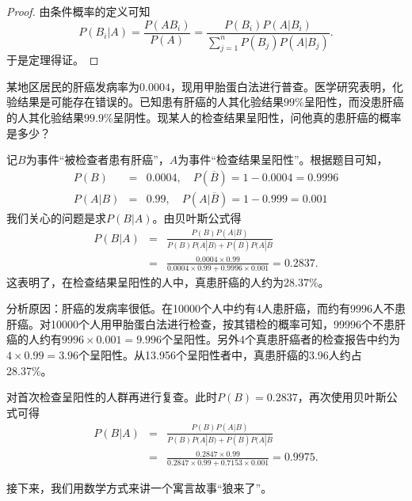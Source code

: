 \begin{proof}
由条件概率的定义可知$$P(B_{i} |A)=\frac{P(AB_{i} )}{P(A)} =\frac{P(B_{i} )P(A|B_{i} )}{\sum_{j=1}^{n} P(B_{j} )P(A|B_{j} )}.$$
于是定理得证。
\end{proof}

\begin{example}\label{ex:chap01_bayes_formula_liver_cancer}
某地区居民的肝癌发病率为$0.0004$，现用甲胎蛋白法进行普查。医学研究表明，化验结果是可能存在错误的。已知患有肝癌的人其化验结果$99\%$呈阳性，而没患肝癌的人其化验结果$99.9\%$呈阴性。现某人的检查结果呈阳性，问他真的患肝癌的概率是多少？
\end{example}
\begin{solution}
记$B$为事件“被检查者患有肝癌”，$A$为事件“检查结果呈阳性”。根据题目可知，
\begin{eqnarray*}
    P(B) &=& 0.0004, \quad P(\overline{B}) = 1- 0.0004 = 0.9996\\
    P(A|B) &=& 0.99, \quad P(A|\overline{B}) = 1- 0.999 = 0.001
\end{eqnarray*}
我们关心的问题是求$P(B|A)$。由贝叶斯公式得
\begin{eqnarray*}
    P(B|A) &=& \frac{P(B)P(A|B)}{P(B)P(A|B)+P(\overline{B})P(A|\overline{B}}\\
    &=& \frac{0.0004 \times 0.99}{0.0004\times 0.99 + 0.9996 \times 0.001} = 0.2837.
\end{eqnarray*}
这表明了，在检查结果呈阳性的人中，真患肝癌的人约为$28.37\%$。
\end{solution}
\begin{remark}
    分析原因：肝癌的发病率很低。在10000个人中约有4人患肝癌，而约有9996人不患肝癌。对10000个人用甲胎蛋白法进行检查，按其错检的概率可知，99996个不患肝癌的人约有$9996\times 0.001 = 9.996$个呈阳性。另外4个真患肝癌者的检查报告中约为$4\times 0.99 = 3.96$个呈阳性。从13.956个呈阳性者中，真患肝癌的3.96人约占28.37\%。
\end{remark}
\begin{example}
对首次检查呈阳性的人群再进行复查。此时$P(B)=0.2837$，再次使用贝叶斯公式可得
\begin{eqnarray*}
    P(B|A) &=& \frac{P(B)P(A|B)}{P(B)P(A|B)+P(\overline{B})P(A|\overline{B}}\\
    &=& \frac{0.2847 \times 0.99}{0.2847\times 0.99 + 0.7153 \times 0.001} = 0.9975.
\end{eqnarray*}
\end{example}
接下来，我们用数学方式来讲一个寓言故事“狼来了”。
